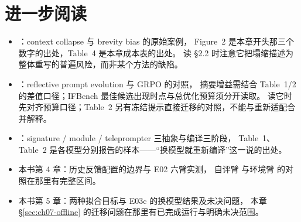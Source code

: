 \section*{进一步阅读}
\begin{itemize}
\sloppy
  \item \cite{ace-2510}：context collapse 与 brevity bias 的原始案例，
        Figure~2 是本章开头那三个数字的出处，Table~4 是本章成本表的出处。
        读 §2.2 时注意它把塌缩描述为整体重写的普遍风险，而非某个方法的缺陷。
  \item \cite{gepa-2507}：reflective prompt evolution 与 GRPO 的对照，
        摘要增益需结合 Table~1/2 的差值口径；IFBench 最佳候选出现时点与总优化预算须分开读取。
        读它时先对齐预算口径；Table~2 另有冻结提示直接迁移的对照，不能与重新适配合并解释。
  \item \cite{dspy-2310}：signature / module / teleprompter 三抽象与编译三阶段，
        Table~1、Table~2 是各模型分别报告的样本——``换模型就重新编译''这一说的出处。
  \item 本书第 4 章：历史反馈配置的边界与 E02 六臂实测，
        自评臂  与环境臂  的对照在那里有完整区间。
  \item 本书第 5 章：两种拟合目标与 E03c 的换模型结果及未决问题，
        本章 §\ref{sec:ch07-offline} 的迁移问题在那里有已完成运行与明确未决范围。
\end{itemize}
